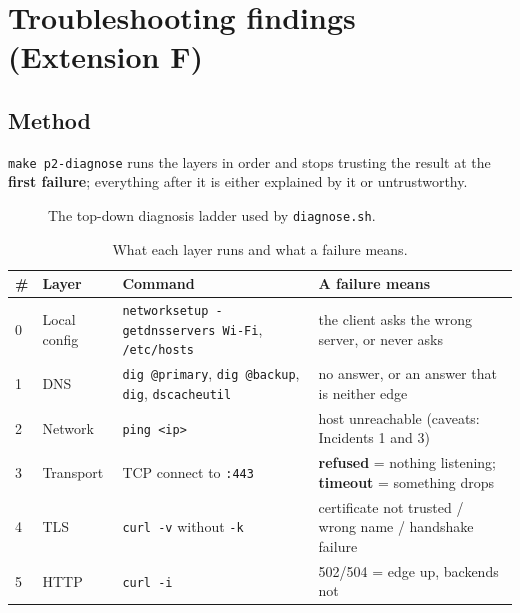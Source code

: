 \documentclass[11pt,a4paper]{article}
\begin{document}
\section{Troubleshooting findings (Extension F)}

\subsection{Method}
\texttt{make p2-diagnose} runs the layers in order and stops trusting the result at the
\textbf{first failure}; everything after it is either explained by it or untrustworthy.

\begin{figure}[H]
\centering
\resizebox{0.96\textwidth}{!}{\drawDiagnose}
\caption{The top-down diagnosis ladder used by \texttt{diagnose.sh}.}
\end{figure}

\begin{table}[H]
\centering
\caption{What each layer runs and what a failure means.}
{\small
\begin{tabular}{@{}L{0.4cm}L{2.0cm}L{6.0cm}L{5.8cm}@{}}
\toprule
\textbf{\#} & \textbf{Layer} & \textbf{Command} & \textbf{A failure means} \\
 & Local config & \texttt{networksetup -getdnsservers Wi-Fi}, \texttt{/etc/hosts} & the client asks the wrong server, or never asks \\
1 & DNS & \texttt{dig @primary}, \texttt{dig @backup}, \texttt{dig}, \texttt{dscacheutil} & no answer, or an answer that is neither edge \\
2 & Network & \texttt{ping <ip>} & host unreachable (caveats: Incidents 1 and 3) \\
3 & Transport & TCP connect to \texttt{:443} & \textbf{refused} = nothing listening; \textbf{timeout} = something drops \\
4 & TLS & \texttt{curl -v} without \texttt{-k} & certificate not trusted / wrong name / handshake failure \\
5 & HTTP & \texttt{curl -i} & 502/504 = edge up, backends not \\
\bottomrule
\end{tabular}}
\end{table}
\end{document}
